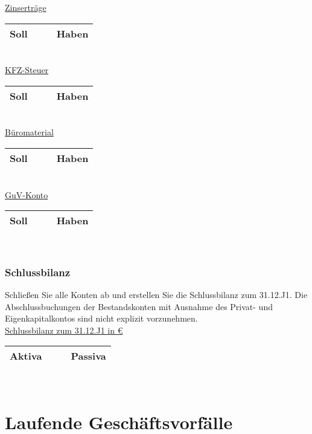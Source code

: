 \documentclass[paper=a4, fontsize=11pt]{scrartcl}
\numberwithin{equation}{section}
\numberwithin{figure}{section}
\numberwithin{table}{section}
\begin{document}
\underline{Zinserträge}

\begin{tabular}{cc|cc}
\hline
Soll & & & Haben \\
\hline
\end{tabular}
\\

\underline{KFZ-Steuer}

\begin{tabular}{cc|cc}
\hline
Soll & & & Haben \\
\hline
\end{tabular}
\\

\underline{Büromaterial}

\begin{tabular}{cc|cc}
\hline
Soll & & & Haben \\
\hline
\end{tabular}
\\

\underline{GuV-Konto}

\begin{tabular}{cc|cc}
\hline
Soll & & & Haben \\
\hline
\end{tabular}
\\

\subsubsection{Schlussbilanz}
Schließen Sie alle Konten ab und erstellen Sie die Schlussbilanz zum 31.12.J1. Die Abschlussbuchungen der Bestandskonten mit Ausnahme des Privat- und Eigenkapitalkontos sind nicht explizit vorzunehmen. \\

\underline{Schlussbilanz zum 31.12.J1 in €}

\begin{tabular}{cc|cc}
\hline
Aktiva & & & Passiva \\
\hline
\end{tabular}
\\

\section{Laufende Geschäftsvorfälle}
\end{document}
